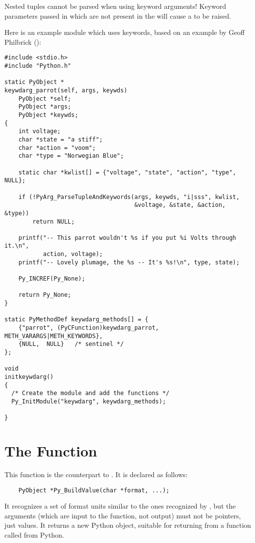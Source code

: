 \documentclass[twoside,openright]{report}
\begin{document}
  Nested tuples cannot be parsed when using keyword
arguments!  Keyword parameters passed in which are not present in the
 will cause a  to be raised.

Here is an example module which uses keywords, based on an example by
Geoff Philbrick ():

\begin{verbatim}
#include <stdio.h>
#include "Python.h"

static PyObject *
keywdarg_parrot(self, args, keywds)
    PyObject *self;
    PyObject *args;
    PyObject *keywds;
{  
    int voltage;
    char *state = "a stiff";
    char *action = "voom";
    char *type = "Norwegian Blue";

    static char *kwlist[] = {"voltage", "state", "action", "type", NULL};

    if (!PyArg_ParseTupleAndKeywords(args, keywds, "i|sss", kwlist, 
                                     &voltage, &state, &action, &type))
        return NULL; 
  
    printf("-- This parrot wouldn't %s if you put %i Volts through it.\n", 
           action, voltage);
    printf("-- Lovely plumage, the %s -- It's %s!\n", type, state);

    Py_INCREF(Py_None);

    return Py_None;
}

static PyMethodDef keywdarg_methods[] = {
    {"parrot", (PyCFunction)keywdarg_parrot, METH_VARARGS|METH_KEYWORDS},
    {NULL,  NULL}   /* sentinel */
};

void
initkeywdarg()
{
  /* Create the module and add the functions */
  Py_InitModule("keywdarg", keywdarg_methods);  
  
}
\end{verbatim}


\section{The  Function}

This function is the counterpart to .  It is
declared as follows:

\bcode\begin{verbatim}
    PyObject *Py_BuildValue(char *format, ...);
\end{verbatim}\ecode
%
It recognizes a set of format units similar to the ones recognized by
, but the arguments (which are input to the
function, not output) must not be pointers, just values.  It returns a
new Python object, suitable for returning from a \C{} function called
from Python.
\end{document}

